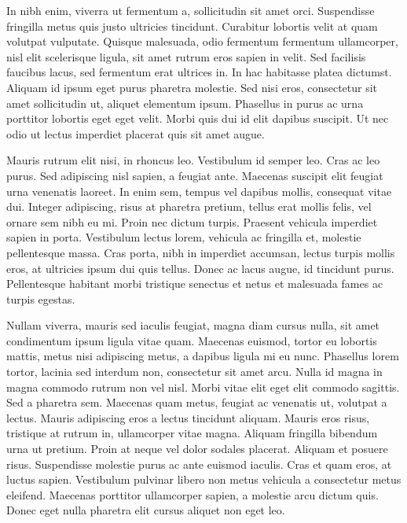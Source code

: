 \documentclass{article}
\begin{document}
In nibh enim, viverra ut fermentum a, sollicitudin sit amet orci. Suspendisse fringilla metus quis justo ultricies tincidunt. Curabitur lobortis velit at quam volutpat vulputate. Quisque malesuada, odio fermentum fermentum ullamcorper, nisl elit scelerisque ligula, sit amet rutrum eros sapien in velit. Sed facilisis faucibus lacus, sed fermentum erat ultrices in. In hac habitasse platea dictumst. Aliquam id ipsum eget purus pharetra molestie. Sed nisi eros, consectetur sit amet sollicitudin ut, aliquet elementum ipsum. Phasellus in purus ac urna porttitor lobortis eget eget velit. Morbi quis dui id elit dapibus suscipit. Ut nec odio ut lectus imperdiet placerat quis sit amet augue.

Mauris rutrum elit nisi, in rhoncus leo. Vestibulum id semper leo. Cras ac leo purus. Sed adipiscing nisl sapien, a feugiat ante. Maecenas suscipit elit feugiat urna venenatis laoreet. In enim sem, tempus vel dapibus mollis, consequat vitae dui. Integer adipiscing, risus at pharetra pretium, tellus erat mollis felis, vel ornare sem nibh eu mi. Proin nec dictum turpis. Praesent vehicula imperdiet sapien in porta. Vestibulum lectus lorem, vehicula ac fringilla et, molestie pellentesque massa. Cras porta, nibh in imperdiet accumsan, lectus turpis mollis eros, at ultricies ipsum dui quis tellus. Donec ac lacus augue, id tincidunt purus. Pellentesque habitant morbi tristique senectus et netus et malesuada fames ac turpis egestas.

Nullam viverra, mauris sed iaculis feugiat, magna diam cursus nulla, sit amet condimentum ipsum ligula vitae quam. Maecenas euismod, tortor eu lobortis mattis, metus nisi adipiscing metus, a dapibus ligula mi eu nunc. Phasellus lorem tortor, lacinia sed interdum non, consectetur sit amet arcu. Nulla id magna in magna commodo rutrum non vel nisl. Morbi vitae elit eget elit commodo sagittis. Sed a pharetra sem. Maecenas quam metus, feugiat ac venenatis ut, volutpat a lectus. Mauris adipiscing eros a lectus tincidunt aliquam. Mauris eros risus, tristique at rutrum in, ullamcorper vitae magna. Aliquam fringilla bibendum urna ut pretium. Proin at neque vel dolor sodales placerat. Aliquam et posuere risus. Suspendisse molestie purus ac ante euismod iaculis. Cras et quam eros, at luctus sapien. Vestibulum pulvinar libero non metus vehicula a consectetur metus eleifend. Maecenas porttitor ullamcorper sapien, a molestie arcu dictum quis. Donec eget nulla pharetra elit cursus aliquet non eget leo.
\end{document}
